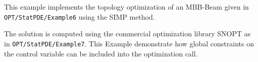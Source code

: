 This example implements the topology optimization of an MBB-Beam given in \\
{\tt OPT/StatPDE/Example6} using the SIMP method.

The solution is computed using the commercial optimization library SNOPT as in 
{\tt OPT/StatPDE/Example7}. This Example demonstrate how global constraints on
the control variable can be included into the optimization call.
